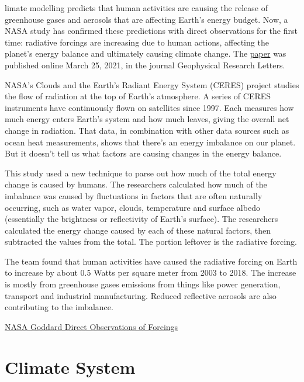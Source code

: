 \documentclass[
]{book}
\begin{document}
limate modelling predicts that human activities are causing the release of greenhouse gases and aerosols that are affecting Earth's energy budget. Now, a NASA study has confirmed these predictions with direct observations for the first time: radiative forcings are increasing due to human actions, affecting the planet's energy balance and ultimately causing climate change.
The \href{https://agupubs.onlinelibrary.wiley.com/doi/10.1029/2020GL091585}{paper} was published online March 25, 2021, in the journal Geophysical Research Letters.

NASA's Clouds and the Earth's Radiant Energy System (CERES) project studies the flow of radiation at the top of Earth's atmosphere. A series of CERES instruments have continuously flown on satellites since 1997. Each measures how much energy enters Earth's system and how much leaves, giving the overall net change in radiation. That data, in combination with other data sources such as ocean heat measurements, shows that there's an energy imbalance on our planet.
But it doesn't tell us what factors are causing changes in the energy balance.

This study used a new technique to parse out how much of the total energy change is caused by humans. The researchers calculated how much of the imbalance was caused by fluctuations in factors that are often naturally occurring, such as water vapor, clouds, temperature and surface albedo (essentially the brightness or reflectivity of Earth's surface).
The researchers calculated the energy change caused by each of these natural factors, then subtracted the values from the total. The portion leftover is the radiative forcing.

The team found that human activities have caused the radiative forcing on Earth to increase by about 0.5 Watts per square meter from 2003 to 2018. The increase is mostly from greenhouse gases emissions from things like power generation, transport and industrial manufacturing. Reduced reflective aerosols are also contributing to the imbalance.

\href{https://www.nasa.gov/feature/goddard/2021/direct-observations-confirm-that-humans-are-throwing-earth-s-energy-budget-off-balance}{NASA Goddard Direct Observations of Forcings}

\hypertarget{part-climate-system}{%
\part{Climate System}\label{part-climate-system}}
\end{document}
